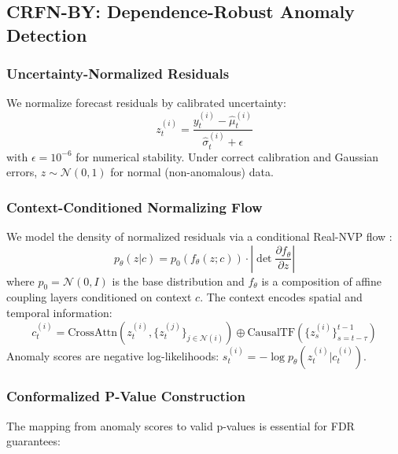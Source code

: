 \documentclass{article}
\theoremstyle{plain}
\theoremstyle{definition}
\theoremstyle{remark}
\begin{document}
\subsection{CRFN-BY: Dependence-Robust Anomaly Detection}
\label{sec:crfn}

\subsubsection{Uncertainty-Normalized Residuals}

We normalize forecast residuals by calibrated uncertainty:
\begin{equation}
z_t^{(i)} = \frac{y_t^{(i)} - \hat{\mu}_t^{(i)}}{\hat{\sigma}_t^{(i)} + \epsilon}
\label{eq:normalized_residual}
\end{equation}
with $\epsilon = 10^{-6}$ for numerical stability. Under correct calibration and Gaussian errors, $z \sim \mathcal{N}(0, 1)$ for normal (non-anomalous) data.

\subsubsection{Context-Conditioned Normalizing Flow}

We model the density of normalized residuals via a conditional Real-NVP flow \citep{dinh2017density,kobyzev2021normalizing,papamakarios2021normalizing}:
\begin{equation}
p_\theta(z | c) = p_0(f_\theta(z; c)) \cdot \left|\det \frac{\partial f_\theta}{\partial z}\right|
\label{eq:flow_density}
\end{equation}
where $p_0 = \mathcal{N}(0, I)$ is the base distribution and $f_\theta$ is a composition of affine coupling layers conditioned on context $c$. The context encodes spatial and temporal information:
\begin{equation}
c_t^{(i)} = \text{CrossAttn}(z_t^{(i)}, \{z_t^{(j)}\}_{j \in \mathcal{N}(i)}) \oplus \text{CausalTF}(\{z_s^{(i)}\}_{s=t-\tau}^{t-1})
\label{eq:context}
\end{equation}
Anomaly scores are negative log-likelihoods: $s_t^{(i)} = -\log p_\theta(z_t^{(i)} | c_t^{(i)})$.

\subsubsection{Conformalized P-Value Construction}

The mapping from anomaly scores to valid p-values is essential for FDR guarantees:
\end{document}
